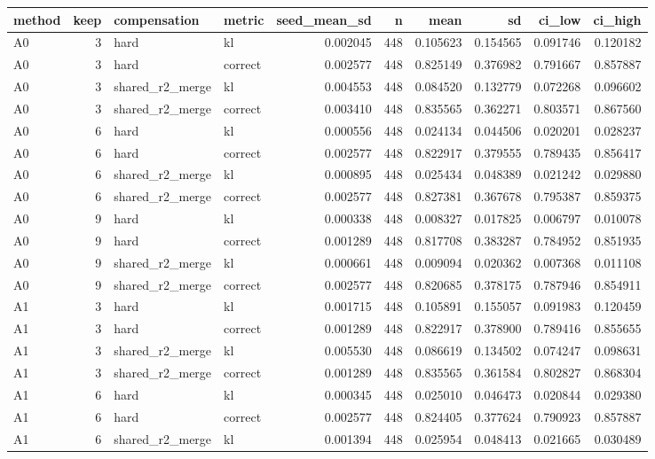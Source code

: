 \begin{tabular}{lrllrrrrrr}
\toprule
method & keep & compensation & metric & seed_mean_sd & n & mean & sd & ci_low & ci_high \\
\midrule
A0 & 3 & hard & kl & 0.002045 & 448 & 0.105623 & 0.154565 & 0.091746 & 0.120182 \\
A0 & 3 & hard & correct & 0.002577 & 448 & 0.825149 & 0.376982 & 0.791667 & 0.857887 \\
A0 & 3 & shared_r2_merge & kl & 0.004553 & 448 & 0.084520 & 0.132779 & 0.072268 & 0.096602 \\
A0 & 3 & shared_r2_merge & correct & 0.003410 & 448 & 0.835565 & 0.362271 & 0.803571 & 0.867560 \\
A0 & 6 & hard & kl & 0.000556 & 448 & 0.024134 & 0.044506 & 0.020201 & 0.028237 \\
A0 & 6 & hard & correct & 0.002577 & 448 & 0.822917 & 0.379555 & 0.789435 & 0.856417 \\
A0 & 6 & shared_r2_merge & kl & 0.000895 & 448 & 0.025434 & 0.048389 & 0.021242 & 0.029880 \\
A0 & 6 & shared_r2_merge & correct & 0.002577 & 448 & 0.827381 & 0.367678 & 0.795387 & 0.859375 \\
A0 & 9 & hard & kl & 0.000338 & 448 & 0.008327 & 0.017825 & 0.006797 & 0.010078 \\
A0 & 9 & hard & correct & 0.001289 & 448 & 0.817708 & 0.383287 & 0.784952 & 0.851935 \\
A0 & 9 & shared_r2_merge & kl & 0.000661 & 448 & 0.009094 & 0.020362 & 0.007368 & 0.011108 \\
A0 & 9 & shared_r2_merge & correct & 0.002577 & 448 & 0.820685 & 0.378175 & 0.787946 & 0.854911 \\
A1 & 3 & hard & kl & 0.001715 & 448 & 0.105891 & 0.155057 & 0.091983 & 0.120459 \\
A1 & 3 & hard & correct & 0.001289 & 448 & 0.822917 & 0.378900 & 0.789416 & 0.855655 \\
A1 & 3 & shared_r2_merge & kl & 0.005530 & 448 & 0.086619 & 0.134502 & 0.074247 & 0.098631 \\
A1 & 3 & shared_r2_merge & correct & 0.001289 & 448 & 0.835565 & 0.361584 & 0.802827 & 0.868304 \\
A1 & 6 & hard & kl & 0.000345 & 448 & 0.025010 & 0.046473 & 0.020844 & 0.029380 \\
A1 & 6 & hard & correct & 0.002577 & 448 & 0.824405 & 0.377624 & 0.790923 & 0.857887 \\
A1 & 6 & shared_r2_merge & kl & 0.001394 & 448 & 0.025954 & 0.048413 & 0.021665 & 0.030489 \\

\end{tabular}
